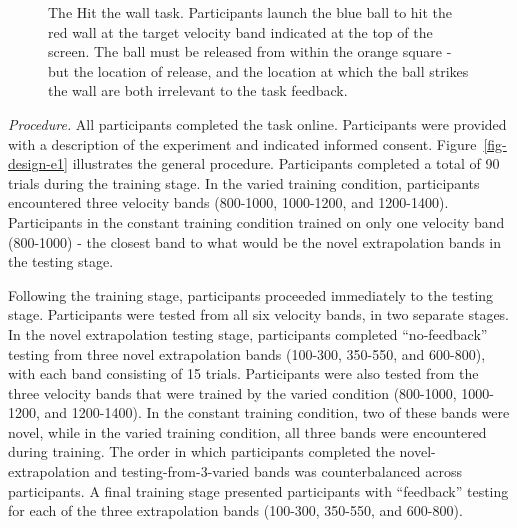 \documentclass[
  11pt,
  letterpaper,
]{article}
\begin{document}
\begin{figure}


\caption{\label{fig-htw-task}The Hit the wall task. Participants launch
the blue ball to hit the red wall at the target velocity band indicated
at the top of the screen. The ball must be released from within the
orange square - but the location of release, and the location at which
the ball strikes the wall are both irrelevant to the task feedback.}

\end{figure}%

\emph{Procedure.} All participants completed the task online.
Participants were provided with a description of the experiment and
indicated informed consent. Figure~\ref{fig-design-e1} illustrates the
general procedure. Participants completed a total of 90 trials during
the training stage. In the varied training condition, participants
encountered three velocity bands (800-1000, 1000-1200, and 1200-1400).
Participants in the constant training condition trained on only one
velocity band (800-1000) - the closest band to what would be the novel
extrapolation bands in the testing stage.

Following the training stage, participants proceeded immediately to the
testing stage. Participants were tested from all six velocity bands, in
two separate stages. In the novel extrapolation testing stage,
participants completed ``no-feedback'' testing from three novel
extrapolation bands (100-300, 350-550, and 600-800), with each band
consisting of 15 trials. Participants were also tested from the three
velocity bands that were trained by the varied condition (800-1000,
1000-1200, and 1200-1400). In the constant training condition, two of
these bands were novel, while in the varied training condition, all
three bands were encountered during training. The order in which
participants completed the novel-extrapolation and testing-from-3-varied
bands was counterbalanced across participants. A final training stage
presented participants with ``feedback'' testing for each of the three
extrapolation bands (100-300, 350-550, and 600-800).
\end{document}
